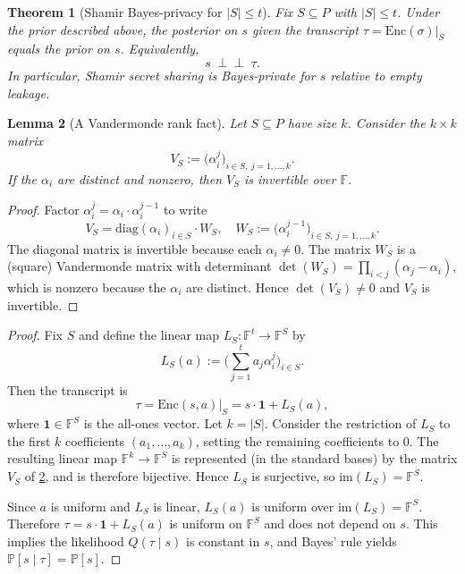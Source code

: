 \documentclass[11pt,a4paper]{article}
\newtheorem{theorem}{Theorem}[section]
\newtheorem{lemma}[theorem]{Lemma}
\theoremstyle{definition}
\theoremstyle{remark}
\newcommand{\F}{\mathbb{F}}
\newcommand{\Parties}{P}
\newcommand{\Prb}{\mathbb{P}}
\newcommand{\Enc}{\mathrm{Enc}}
\begin{document}
\begin{theorem}[Shamir Bayes-privacy for \(|S|\le t\)]
\label{thm:bayes-shamir}
Fix \(S\subseteq\Parties\) with \(|S|\le t\). Under the prior described above, the posterior on \(s\) given the transcript \(\tau=\Enc(\sigma)\vert_S\) equals the prior on \(s\). Equivalently,
\[
s \;\perp\!\!\!\perp\; \tau.
\]
In particular, Shamir secret sharing is Bayes-private for \(s\) relative to empty leakage.
\end{theorem}

\begin{lemma}[A Vandermonde rank fact]
\label{lem:vandermonde-rank}
Let \(S\subseteq\Parties\) have size \(k\). Consider the \(k\times k\) matrix
\[
V_S := \bigl(\alpha_i^j\bigr)_{i\in S,\ j=1,\dots,k}.
\]
If the \(\alpha_i\) are distinct and nonzero, then \(V_S\) is invertible over \(\F\).
\end{lemma}

\begin{proof}
Factor \(\alpha_i^j = \alpha_i\cdot \alpha_i^{j-1}\) to write
\[
V_S = \mathrm{diag}(\alpha_i)_{i\in S}\cdot W_S,
\quad
W_S := \bigl(\alpha_i^{j-1}\bigr)_{i\in S,\ j=1,\dots,k}.
\]
The diagonal matrix is invertible because each \(\alpha_i\neq 0\). The matrix \(W_S\) is a (square) Vandermonde matrix with determinant
\(\det(W_S)=\prod_{i<j}(\alpha_j-\alpha_i)\), which is nonzero because the \(\alpha_i\) are distinct. Hence \(\det(V_S)\neq 0\) and \(V_S\) is invertible.
\end{proof}

\begin{proof}
Fix \(S\) and define the linear map \(L_S:\F^t\to\F^S\) by
\[
L_S(a) := \bigl(\sum_{j=1}^t a_j \alpha_i^j\bigr)_{i\in S}.
\]
Then the transcript is
\[
\tau = \Enc(s,a)\vert_S = s\cdot \mathbf{1} + L_S(a),
\]
where \(\mathbf{1}\in\F^S\) is the all-ones vector.
Let \(k=|S|\). Consider the restriction of \(L_S\) to the first \(k\) coefficients \((a_1,\dots,a_k)\), setting the remaining coefficients to \(0\). The resulting linear map \(\F^k\to \F^S\) is represented (in the standard bases) by the matrix \(V_S\) of \cref{lem:vandermonde-rank}, and is therefore bijective. Hence \(L_S\) is surjective, so \(\mathrm{im}(L_S)=\F^S\).

Since \(a\) is uniform and \(L_S\) is linear, \(L_S(a)\) is uniform over \(\mathrm{im}(L_S)=\F^S\). Therefore \(\tau=s\cdot\mathbf{1}+L_S(a)\) is uniform on \(\F^S\) and does not depend on \(s\). This implies the likelihood \(Q(\tau\mid s)\) is constant in \(s\), and Bayes' rule yields \(\Prb[s\mid \tau]=\Prb[s]\).
\end{proof}
\end{document}
